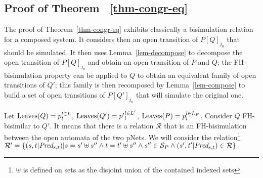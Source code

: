 \documentclass{lncs/llncs}
\begin{document}
 \subsection{Proof of Theorem ~\ref{thm-congr-eq}}
 The proof of Theorem~\ref{thm-congr-eq} exhibits classically a bisimulation relation for 
 a 
 composed system.  It considers then an open transition of $P[Q]_{j_0}$ that should be 
 simulated. It then uses  Lemma~\ref{lem-decompose} to decompose the open transition 
 of $P[Q]_{j_0}$ and obtain an open transition of $P$ and $Q$; the FH-bisimulation 
 property can 
 be applied  to $Q$ to obtain an equivalent family of open transitions of $Q'$; this 
 family is 
 then recomposed by Lemma~\ref{lem-compose} to build a set of open transitions of 
 $P[Q']_{j_0}$ 
 that will simulate the original one.
 

 Let $\operatorname{Leaves}(Q)=p_l^{l\in L}$, $\operatorname{Leaves}(Q')={p'}_l^{l\in L'}$, 
 $\operatorname{Leaves}(P)=p_l^{l\in L_P}$.
 Consider $Q$ FH-bisimilar to $Q'$. It means that there is a relation 
 $\mathcal{R}$ that is an FH-bisimulation between the open automata of the two pNets. 
 We will consider the relation\footnote{$\uplus$ is defined on sets as the disjoint union 
 of the contained indexed 
 sets} $\mathcal{R}'=\{(s,t|\Pred_{s,t})|s=s'\uplus s'' \land 
 t=t'\uplus s'' \land s''\in \mathcal{S}_P \land (s',t'|\Pred_{s,t})\in\mathcal{R}\}$ 
  
\end{document}
